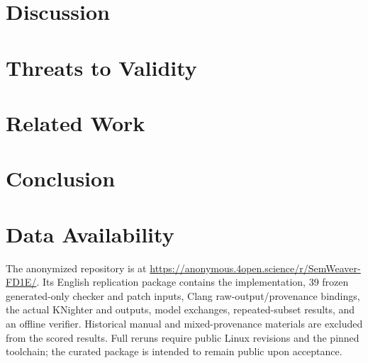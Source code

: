 \documentclass[acmsmall,screen,review,anonymous]{acmart}
\begin{document}
\section{Discussion}\label{sec:discussion}


\section{Threats to Validity}\label{sec:threats}


\section{Related Work}\label{sec:related}


\section{Conclusion}\label{sec:conclusion}


\section*{Data Availability}
The anonymized repository is at
\url{https://anonymous.4open.science/r/SemWeaver-FD1E/}.
Its English replication package contains the implementation, 39 frozen
generated-only checker and patch inputs, Clang raw-output/provenance bindings,
the actual KNighter and \toolname outputs, model exchanges, repeated-subset
results, and an offline verifier. Historical manual and mixed-provenance
materials are excluded from the scored results.
Full reruns require public Linux revisions and the pinned toolchain; the
curated package is intended to remain public upon acceptance.



\end{document}
